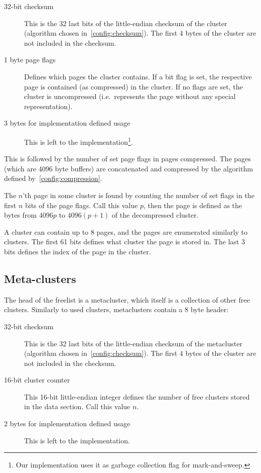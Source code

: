 \documentclass[11pt,a4paper]{report}
\newcommand{\pagesize}{4096 }
\begin{document}
        \begin{description}
            \item [32-bit checksum] This is the 32 last bits of the
                little-endian checksum of the cluster (algorithm
                chosen in~\ref{config:checksum}). The first 4 bytes of
                the cluster are not included in the checksum.
            \item [1 byte page flags] Defines which pages the cluster contains.
                If a bit flag is set, the respective page is contained (as
                compressed) in the cluster. If no flags are set, the cluster is
                uncompressed (i.e.\ represents the page without any special
                representation).
            \item [3 bytes for implementation defined usage] This is
                left to the implementation\footnote{Our implementation
                uses it as garbage collection flag for mark-and-sweep.}.
        \end{description}

        This is followed by the number of set page flags in pages compressed.
        The pages (which are \pagesize byte buffers) are concatenated and
        compressed by the algorithm defined by~\ref{config:compression}.

        The $n$'th page in some cluster is found by counting the number of set
        flags in the first $n$ bits of the page flags. Call this value $p$,
        then the page is defined as the bytes from $\pagesize p$ to $\pagesize
        (p + 1)$ of the decompressed cluster.

        A cluster can contain up to 8 pages, and the pages are enumerated
        similarly to clusters. The first 61 bits defines what cluster the page
        is stored in. The last 3 bits defines the index of the page in the
        cluster.

        \subsection{Meta-clusters}
        \label{cluster:metacluster}
        The head of the freelist is a metacluster, which itself is a collection
        of other free clusters. Similarly to used clusters, metaclusters
        contain a 8 byte header:

        \begin{description}
            \item [32-bit checksum] This is the 32 last bits of the
                little-endian checksum of the metacluster (algorithm chosen
                in~\ref{config:checksum}). The first 4 bytes of the cluster are
                not included in the checksum.
            \item [16-bit cluster counter] This 16-bit little-endian integer
                defines the number of free clusters stored in the data section.
                Call this value $n$.
            \item [2 bytes for implementation defined usage] This is
                left to the implementation.
        \end{description}
\end{document}
